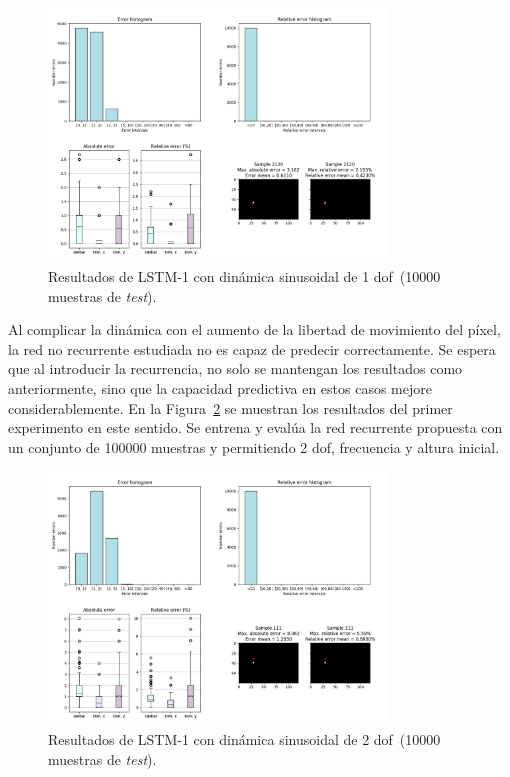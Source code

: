 \begin{figure}[H]
		\begin{center}
			\includegraphics[width=0.8\textwidth]{ figures/test_mod/REC/simple/sin_fix_100000.png}
			\caption{Resultados de LSTM-1 con dinámica sinusoidal de 1 \acrshort{dof}~(10000 muestras de \textit{test}).}
			\label{fig.rec_sin_fix_100000}
		\end{center}
\end{figure}

Al complicar la dinámica con el aumento de la libertad de movimiento del píxel, la red no recurrente estudiada no es capaz de predecir correctamente. Se espera que al introducir la recurrencia, no solo se mantengan los resultados como anteriormente, sino que la capacidad predictiva en estos casos mejore considerablemente. En la Figura~\ref{fig.rec_sin_var_100000} se muestran los resultados del primer experimento en este sentido. Se entrena y evalúa la red recurrente propuesta con un conjunto de 100000 muestras y permitiendo 2 \acrshort{dof}, frecuencia y altura inicial.

\begin{figure}[H]
		\begin{center}
			\includegraphics[width=0.8\textwidth]{ figures/test_mod/REC/simple/sin_var_100000.png}
			\caption{Resultados de LSTM-1 con dinámica sinusoidal de 2 \acrshort{dof}~(10000 muestras de \textit{test}).}
			\label{fig.rec_sin_var_100000}
		\end{center}
\end{figure}
\vspace{-10pt}

